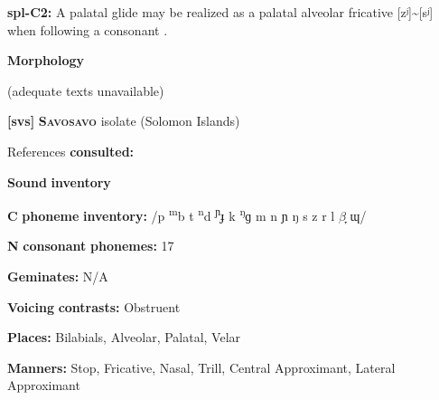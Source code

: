 \documentclass[output=paper]{langsci/langscibook}
\begin{document}
\begin{styleBody}
\textbf{spl-C2:} A palatal glide may be realized as a palatal alveolar fricative [zʲ]{\textasciitilde}[sʲ] when following a consonant \citep{McElhanon1970}.
\end{styleBody}

\begin{styleBody}
\textbf{Morphology}
\end{styleBody}

\begin{styleBody}
(adequate texts unavailable)
\end{styleBody}

\begin{styleBody}
\textbf{[svs]}   \textbf{\textsc{Savosavo}}  isolate (Solomon Islands)
\end{styleBody}

\begin{styleBody}
References \textbf{consulted:} \citet{Wegener2008}
\end{styleBody}

\begin{styleBody}
\textbf{Sound} \textbf{inventory}
\end{styleBody}

\begin{styleBody}
\textbf{C} \textbf{phoneme} \textbf{inventory:} /p \textsuperscript{m}b t \textsuperscript{n}d \textsuperscript{ɲ}ɟ k \textsuperscript{ŋ}ɡ m n ɲ ŋ s z r l $\beta ̞$ ɰ/
\end{styleBody}

\begin{styleBody}
\textbf{N} \textbf{consonant} \textbf{phonemes:} 17
\end{styleBody}

\begin{styleBody}
\textbf{Geminates:} N/A
\end{styleBody}

\begin{styleBody}
\textbf{Voicing} \textbf{contrasts:} Obstruent
\end{styleBody}

\begin{styleBody}
\textbf{Places:} Bilabials, Alveolar, Palatal, Velar
\end{styleBody}

\begin{styleBody}
\textbf{Manners:} Stop, Fricative, Nasal, Trill, Central Approximant, Lateral Approximant
\end{styleBody}
\end{document}
